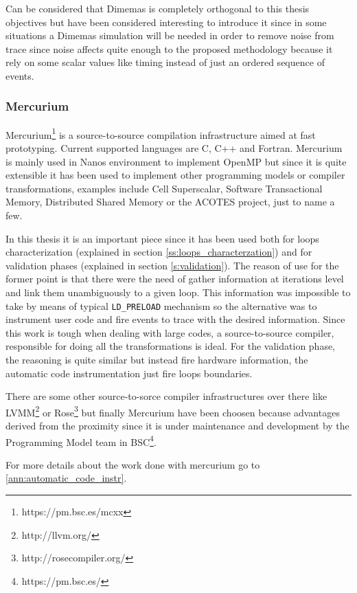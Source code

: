 Can be considered that Dimemas is completely orthogonal to this thesis objectives
but have been considered interesting to introduce it since in some situations a
Dimemas simulation will be needed in order to remove noise from trace since
noise affects quite enough to the proposed methodology because it rely on some
scalar values like timing instead of just an ordered sequence of events.

\subsubsection{Mercurium}\label{ss:mercurium}

Mercurium\footnote{https://pm.bsc.es/mcxx} is a source-to-source compilation 
infrastructure aimed at fast prototyping. Current supported languages are C, C++
and Fortran. Mercurium is mainly used in Nanos environment to implement OpenMP but
since it is quite extensible it has been used to implement other programming models
or compiler transformations, examples include Cell Superscalar, Software Transactional
Memory, Distributed Shared Memory or the ACOTES project, just to name a few. 

In this thesis it is an important piece since it has been used both for loops
characterization (explained in section \ref{ss:loops_characterzation}) and for
validation phases (explained in section \ref{s:validation}). The reason of use for the former point
is that there were the need of gather information at iterations level and link them
unambiguously to a given loop. This information was impossible to take by means of
typical {\tt LD\_PRELOAD} mechanism so the alternative was to instrument user code and
fire events to trace with the desired information. Since this work is tough when
dealing with large codes, a source-to-source compiler, responsible for doing all the
transformations is ideal. For the validation phase, the reasoning is quite similar but
instead fire hardware information, the automatic code instrumentation just fire loops
boundaries.

There are some other source-to-sorce compiler infrastructures over there like
LVMM\footnote{http://llvm.org/} or Rose\footnote{http://rosecompiler.org/} but finally
Mercurium have been choosen because advantages derived from the proximity since it is
under maintenance and development by the Programming Model team in 
BSC\footnote{https://pm.bsc.es/}.

For more details about the work done with mercurium go to \ref{ann:automatic_code_instr}.

